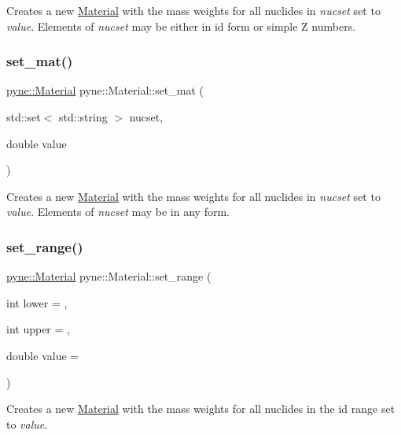 Creates a new \hyperlink{classpyne_1_1_material}{Material} with the mass weights for all nuclides in {\itshape nucset} set to {\itshape value}. Elements of {\itshape nucset} may be either in id form or simple Z numbers. \mbox{\label{classpyne_1_1_material_a878002d7dfce0dd5a2ed518c6afc6b10}} 
\subsubsection{\texorpdfstring{set\+\_\+mat()}{set\_mat()}\hspace{0.1cm}{\footnotesize\ttfamily [2/2]}}
{\footnotesize\ttfamily \hyperlink{classpyne_1_1_material}{pyne\+::\+Material} pyne\+::\+Material\+::set\+\_\+mat (\begin{DoxyParamCaption}\item[{std\+::set$<$ std\+::string $>$}]{nucset,  }\item[{double}]{value }\end{DoxyParamCaption})}

Creates a new \hyperlink{classpyne_1_1_material}{Material} with the mass weights for all nuclides in {\itshape nucset} set to {\itshape value}. Elements of {\itshape nucset} may be in any form. \mbox{\label{classpyne_1_1_material_af81eb0e8c7f65792bc699c4aec82bb7e}} 
\subsubsection{\texorpdfstring{set\+\_\+range()}{set\_range()}}
{\footnotesize\ttfamily \hyperlink{classpyne_1_1_material}{pyne\+::\+Material} pyne\+::\+Material\+::set\+\_\+range (\begin{DoxyParamCaption}\item[{int}]{lower = {},  }\item[{int}]{upper = {},  }\item[{double}]{value = {} }\end{DoxyParamCaption})}

Creates a new \hyperlink{classpyne_1_1_material}{Material} with the mass weights for all nuclides in the id range set to {\itshape value}. \mbox{\label{classpyne_1_1_material_aa38cb12439e08391849d41f803f03495}} 
